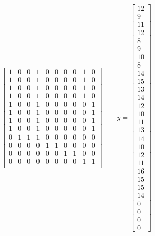 \documentclass[11pt]{article}
\begin{document}
\begin{enumerate}
\begin{equation*}
\begin{bmatrix}
1 & 0 & 0 & 1 & 0 & 0 & 0 & 0 & 1 & 0 \\
1 & 0 & 0 & 1 & 0 & 0 & 0 & 0 & 1 & 0 \\
1 & 0 & 0 & 1 & 0 & 0 & 0 & 0 & 1 & 0 \\
1 & 0 & 0 & 1 & 0 & 0 & 0 & 0 & 1 & 0 \\

1 & 0 & 0 & 1 & 0 & 0 & 0 & 0 & 0 & 1 \\
1 & 0 & 0 & 1 & 0 & 0 & 0 & 0 & 0 & 1 \\
1 & 0 & 0 & 1 & 0 & 0 & 0 & 0 & 0 & 1 \\
1 & 0 & 0 & 1 & 0 & 0 & 0 & 0 & 0 & 1 \\

0 & 1 & 1 & 1 & 0 & 0 & 0 & 0 & 0 & 0 \\
0 & 0 & 0 & 0 & 1 & 1 & 0 & 0 & 0 & 0 \\
0 & 0 & 0 & 0 & 0 & 0 & 1 & 1 & 0 & 0 \\
0 & 0 & 0 & 0 & 0 & 0 & 0 & 0 & 1 & 1 \\
\end{bmatrix}\qquad y=\begin{bmatrix}
12 \\  9 \\ 11 \\ 12 \\
 8 \\  9 \\ 10 \\  8 \\
14 \\ 15 \\ 13 \\ 14 \\
12 \\ 10 \\ 11 \\ 13 \\
14 \\ 10 \\ 12 \\ 11 \\
16 \\ 15 \\ 15 \\ 14 \\

0 \\ 0 \\ 0 \\ 0
\end{bmatrix}
\end{equation*}


\end{enumerate}
\end{document}
